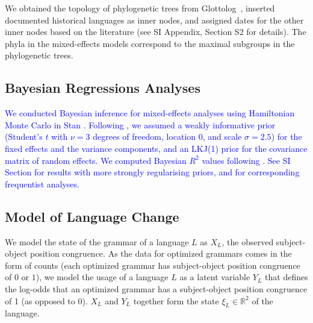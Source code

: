 \documentclass[9pt,twocolumn,twoside,lineno]{pnas-new}
\begin{document}
{We obtained the topology of phylogenetic trees from Glottolog~\citep{nordhoff2011glottolog}, inserted documented historical languages as inner nodes, and assigned dates for the other inner nodes based on the literature (see SI Appendix, Section S2 for details).
The phyla in the mixed-effects models correspond to the maximal subgroups in the phylogenetic trees.


\subsection*{Bayesian Regressions Analyses}
\textcolor{blue}{
We conducted Bayesian inference for mixed-effects analyses using Hamiltonian Monte Carlo in Stan \citep{homan2014the,carpenter2017stan, buerkner2017brms}.
Following \citep{burkner2018advanced}, we assumed a weakly informative prior (Student's $t$ with $\nu=3$ degrees of freedom, location 0, and scale $\sigma=2.5$) for the fixed effects and the variance components, and an LKJ(1) prior \citep{lewandowski2009generating} for the covariance matrix of random effects. %
We computed Bayesian $R^2$ values following \cite{gelman2019r}.
See SI Section for results with more strongly regularising priors, and for corresponding frequentist analyses.
}



\subsection*{Model of Language Change}



We model the state of the grammar of a language $L$ as $X_L$, the observed subject-object position congruence.
As the data for optimized grammars comes in the form of counts (each optimized grammar has subject-object position congruence of $0$ or $1$), we model the usage of a language $L$ as a latent variable $Y_L$ that defines the log-odds that an optimized grammar has a subject-object position congruence of 1 (as opposed to 0).
$X_L$ and $Y_L$ together form the state $\xi_L \in \mathbb{R}^2$  of the language.

}
\end{document}
